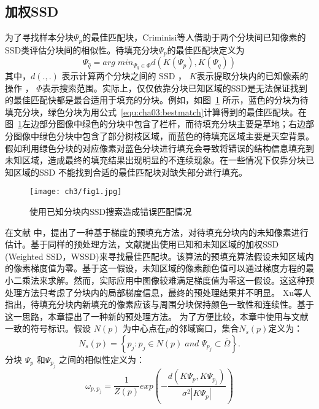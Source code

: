  \subsection{加权SSD}
 \label{sec:sub:WSSD}
 为了寻找样本分块\(\Psi_p\)的最佳匹配块，Criminisi等人\cite{Criminisi04regionfilling}借助于两个分块间已知像素的SSD类评估分块间的相似性。待填充分块\(\Psi_p\)的最佳匹配块定义为
 \begin{equation}
 \label{equ:cha03:bestmatch}
 \Psi_{\hat{q}}=arg\;min_{\Psi_q\in\Phi}d(K(\Psi_p),K(\Psi_q))
 \end{equation}
 其中，\(d(.,.)\) 表示计算两个分块之间的 SSD ， \(K\)表示提取分块内的已知像素的操作 ， \(\Phi\)表示搜索范围。实际上，仅仅依靠分块已知区域的SSD是无法保证找到的最佳匹配快都是最合适用于填充的分块。例如，如图~\ref{cha03:fig:1} 所示，蓝色的分块为待填充分块，绿色分块为用公式~\ref{equ:cha03:bestmatch}计算得到的最佳匹配块。在图~\ref{cha03:fig:1}左边部分图像中绿色的分块中包含了栏杆，而待填充分块主要是草地；右边部分图像中绿色分块中包含了部分树枝区域，而蓝色的待填充区域主要是天空背景。假如利用绿色分块的对应像素对蓝色分块进行填充会导致将错误的结构信息填充到未知区域，造成最终的填充结果出现明显的不连续现象。在一些情况下仅靠分块已知区域的SSD 不能找到合适的最佳匹配块对缺失部分进行填充。
 \begin{figure}[!htbp]
 	\begin{center}
 			\texttt{[image: ch3/fig1.jpg]}
 	\end{center}
     \caption{使用已知分块内SSD搜索造成错误匹配情况}
 	\label{cha03:fig:1}
 \end{figure}
 在文献 中，提出了一种基于梯度的预填充方法，对待填充分块内的未知像素进行估计。基于同样的预处理方法，文献提出使用已知和未知区域的加权SSD (Weighted SSD，WSSD)来寻找最佳匹配块。该算法的预填充算法假设未知区域内的像素梯度值为零。基于这一假设，未知区域的像素颜色值可以通过梯度方程的最小二乘法来求解。然而，实际应用中图像较难满足梯度值为零这一假设。这这种预处理方法只考虑了分块内的局部梯度信息，最终的预处理结果并不明显。 Xu等人\cite{Xu:2010}指出，待填充分块内新填充的像素应该与周围分块保持颜色一致性和连续性。基于这一思路，本章提出了一种新的预处理方法。
 为了方便比较，本章中使用与文献一致的符号标识。假设 \(N(p)\) 为中心点在\(p\)的邻域窗口，集合\(N_s(p)\)定义为：
 $$N_s(p)= \left\{ p_j:p_j \in N(p)\;and\;\Psi_{p_j} \subset \overline{\Omega} \right\}.$$
 分块 \(\Psi_p\) 和\(\Psi_{p_j}\)  之间的相似性定义为：
 $$\omega_{p,p_{j}}=\frac{1}{Z(p)}exp\left(-\frac{d(K\Psi_p,K\Psi_{p_j})}{\sigma^2\left|K\Psi_p\right|}\right)$$
